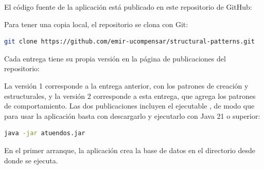 %
%

El código fuente de la aplicación está publicado en este repositorio de GitHub:


Para tener una copia local, el repositorio se clona con Git:

\begin{lstlisting}[style=command, language=bash]
git clone https://github.com/emir-ucompensar/structural-patterns.git
\end{lstlisting}

Cada entrega tiene su propia versión en la página de publicaciones del repositorio:


La versión 1 corresponde a la entrega anterior, con los patrones de creación y estructurales, y la versión 2 corresponde a esta entrega, que agrega los patrones de comportamiento. Las dos publicaciones incluyen el ejecutable , de modo que para usar la aplicación basta con descargarlo y ejecutarlo con Java 21 o superior:

\begin{lstlisting}[style=command, language=bash]
java -jar atuendos.jar
\end{lstlisting}

En el primer arranque, la aplicación crea la base de datos  en el directorio desde donde se ejecuta.
